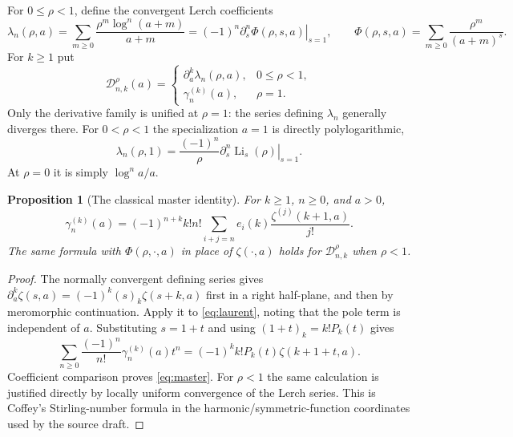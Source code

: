 \documentclass[11pt]{article}
\newtheorem{proposition}[theorem]{Proposition}
\theoremstyle{definition}
\theoremstyle{remark}
\newcommand{\D}{\mathcal D}
\DeclareMathOperator{\Li}{Li}
\begin{document}
For $0\leq\rho<1$, define the convergent Lerch coefficients
\begin{equation}\label{eq:lambda}
 \lambda_n(\rho,a)=\sum_{m\geq0}\frac{\rho^m\log^n(a+m)}{a+m}
   =(-1)^n\left.\partial_s^n\Phi(\rho,s,a)\right|_{s=1},
 \qquad
 \Phi(\rho,s,a)=\sum_{m\geq0}\frac{\rho^m}{(a+m)^s}.
\end{equation}
For $k\geq1$ put
\begin{equation}\label{eq:Dfamily}
 \D_{n,k}^{\rho}(a)=
 \begin{cases}
 \partial_a^k\lambda_n(\rho,a),&0\leq\rho<1,\\
 \gamma_n^{(k)}(a),&\rho=1.
 \end{cases}
\end{equation}
Only the derivative family is unified at $\rho=1$: the series defining $\lambda_n$ generally diverges there. For $0<\rho<1$ the specialization $a=1$ is directly polylogarithmic,
\begin{equation}
 \lambda_n(\rho,1)=\frac{(-1)^n}{\rho}
       \left.\partial_s^n\Li_s(\rho)\right|_{s=1}.
\end{equation}
At $\rho=0$ it is simply $\log^n a/a$.

\begin{proposition}[The classical master identity]\label{prop:master}
For $k\geq1$, $n\geq0$, and $a>0$,
\begin{equation}\label{eq:master}
 \gamma_n^{(k)}(a)=(-1)^{n+k}k!n!
     \sum_{i+j=n}e_i(k)\frac{\zeta^{(j)}(k+1,a)}{j!}.
\end{equation}
The same formula with $\Phi(\rho,\cdot,a)$ in place of $\zeta(\cdot,a)$ holds for $\D_{n,k}^{\rho}$ when $\rho<1$.
\end{proposition}
\begin{proof}
The normally convergent defining series gives
$\partial_a^k\zeta(s,a)=(-1)^k(s)_k\zeta(s+k,a)$ first in a right half-plane, and then by meromorphic continuation. Apply it to \eqref{eq:laurent}, noting that the pole term is independent of $a$. Substituting $s=1+t$ and using $(1+t)_k=k!P_k(t)$ gives
\begin{equation}\label{eq:mastergen}
 \sum_{n\geq0}\frac{(-1)^n}{n!}\gamma_n^{(k)}(a)t^n
     =(-1)^k k!P_k(t)\zeta(k+1+t,a).
\end{equation}
Coefficient comparison proves \eqref{eq:master}. For $\rho<1$ the same calculation is justified directly by locally uniform convergence of the Lerch series. This is Coffey's Stirling-number formula in the harmonic/symmetric-function coordinates used by the source draft.
\end{proof}
\end{document}
